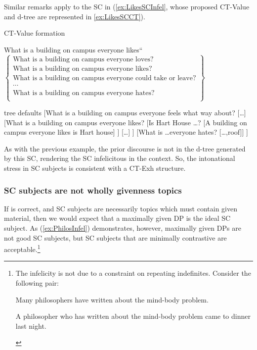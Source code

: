 \documentclass[
	letterpaper,
]{article}
\begin{document}
Similar remarks apply to the SC in (\ref{ex:LikesSCInfel}, whose proposed CT-Value and d-tree are represented in \ref{ex:LikesSCCT}).
\begin{exe}
	\ex\label{ex:LikesSCCT}
	\begin{xlist}
		\ex CT-Value formation
		\begin{xlist}
			 What is a building on campus everyone likes``
			 $
			\begin{Bmatrix}
				\text{What is a building on campus everyone loves?}\\
				\text{What is a building on campus everyone likes?}\\
				\text{What is a building on campus everyone could take or leave?}\\
				\cdots\\
				\text{What is a building on campus everyone hates?}\\
			\end{Bmatrix}
			$			
		\end{xlist}
		\ex
		\begin{forest}
			tree defaults
			[What is a building on campus everyone feels what way about?
				[\ldots]
				[What is a building on campus everyone likes?
					[Is Hart House \ldots?
						[A building on campus everyone likes is Hart house]
					]
					[\ldots]
				]
				[What is \ldots everyone hates?
				[\ldots,roof]]
			]
		\end{forest}	
	\end{xlist}
\end{exe}
As with the previous example, the prior discourse is not in the d-tree generated by this SC, rendering the SC infelicitous in the context.
So, the intonational stress in SC subjects is consistent with a CT-Exh structure.
\subsubsection{SC subjects are not wholly givenness topics}
If \textcite{mikkelsen2005copular} is correct, and SC subjects are necessarily topics which must contain given material, then we would expect that a maximally given DP is the ideal SC subject.
As (\ref{ex:PhilosInfel}) demonstrates, however, maximally given DPs are not good SC subjects, but SC subjects that are minimally contrastive are acceptable.\footnote{
  The infelicity is not due to a constraint on repeating indefinites.
  Consider the following pair:
  \begin{xlisti}
	  \ex Many philosophers have written about the mind-body problem.
	  \begin{xlista}
		  \ex A philosopher who has written about the mind-body problem came to dinner last night.
	  \end{xlista}	  
  \end{xlisti}
}
\end{document}
